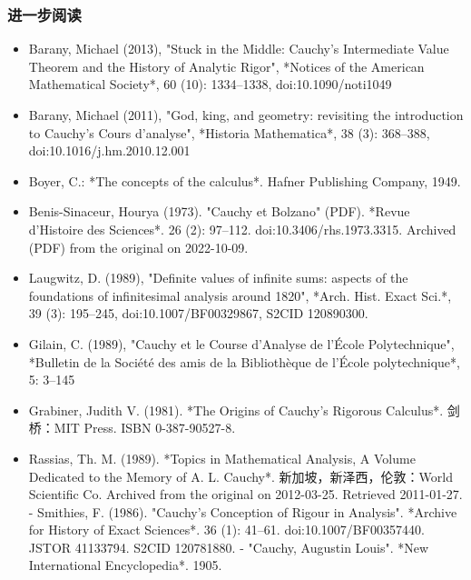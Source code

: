 \subsubsection{进一步阅读}
\begin{itemize}
\item Barany, Michael (2013), "Stuck in the Middle: Cauchy's Intermediate Value Theorem and the History of Analytic Rigor", *Notices of the American Mathematical Society*, 60 (10): 1334–1338, doi:10.1090/noti1049
\item Barany, Michael (2011), "God, king, and geometry: revisiting the introduction to Cauchy's Cours d'analyse", *Historia Mathematica*, 38 (3): 368–388, doi:10.1016/j.hm.2010.12.001
\item Boyer, C.: *The concepts of the calculus*. Hafner Publishing Company, 1949.
\item Benis-Sinaceur, Hourya (1973). "Cauchy et Bolzano" (PDF). *Revue d'Histoire des Sciences*. 26 (2): 97–112. doi:10.3406/rhs.1973.3315. Archived (PDF) from the original on 2022-10-09.
\item Laugwitz, D. (1989), "Definite values of infinite sums: aspects of the foundations of infinitesimal analysis around 1820", *Arch. Hist. Exact Sci.*, 39 (3): 195–245, doi:10.1007/BF00329867, S2CID 120890300.
\item Gilain, C. (1989), "Cauchy et le Course d'Analyse de l'École Polytechnique", *Bulletin de la Société des amis de la Bibliothèque de l'École polytechnique*, 5: 3–145
\item Grabiner, Judith V. (1981). *The Origins of Cauchy's Rigorous Calculus*. 剑桥：MIT Press. ISBN 0-387-90527-8.
\item Rassias, Th. M. (1989). *Topics in Mathematical Analysis, A Volume Dedicated to the Memory of A. L. Cauchy*. 新加坡，新泽西，伦敦：World Scientific Co. Archived from the original on 2012-03-25. Retrieved 2011-01-27.
- Smithies, F. (1986). "Cauchy's Conception of Rigour in Analysis". *Archive for History of Exact Sciences*. 36 (1): 41–61. doi:10.1007/BF00357440. JSTOR 41133794. S2CID 120781880.
- "Cauchy, Augustin Louis". *New International Encyclopedia*. 1905.  
\end{itemize}